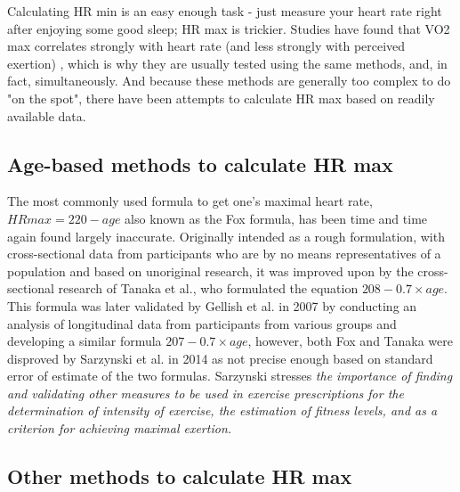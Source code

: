 Calculating HR min is an easy enough task - just measure your heart rate right after enjoying some good sleep; HR max is trickier.
Studies have found that VO2 max correlates strongly with heart rate (and less strongly with perceived exertion) \cite{vo2-max-hr-correlation}, which is why they are usually tested using the same methods, and, in fact, simultaneously.
And because these methods are generally too complex to do "on the spot", there have been attempts to calculate HR max based on readily available data.

\subsection*{Age-based methods to calculate HR max}
The most commonly used formula to get one's maximal heart rate, $HRmax=220-age$ also known as the Fox formula, has been time and time again found largely inaccurate.
Originally intended as a rough formulation, with cross-sectional data from participants who are by no means representatives of a population\cite{220-hrmax-new-formula} and based on unoriginal research\cite{220-hrmax-disproved}, it was improved upon by the cross-sectional research of Tanaka et al., who formulated the equation $208-0.7\times age$.
This formula was later validated by Gellish et al. in 2007 by conducting an analysis of longitudinal data from participants from various groups and developing a similar formula $207-0.7\times age$,
however, both Fox and Tanaka were disproved by Sarzynski et al. in 2014 as not precise enough based on standard error of estimate of the two formulas.\cite{hrmax-age-disproved}
Sarzynski stresses \textit{the importance of finding and validating other measures to be used in exercise prescriptions for the determination of intensity of exercise, the estimation of fitness levels, and as a criterion for achieving maximal exertion.}

\subsection*{Other methods to calculate HR max}